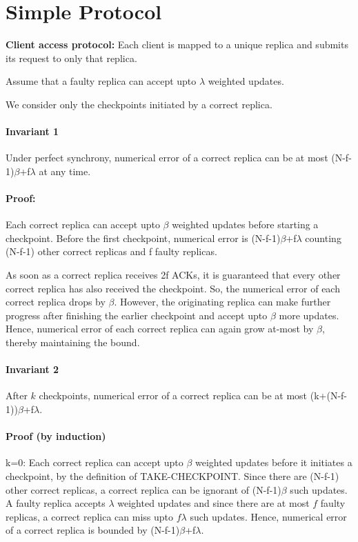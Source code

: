 \documentclass[letterpaper,twocolumn,10pt]{article}
\begin{document}
\section{Simple Protocol}
\textbf{Client access protocol:}
Each client is mapped to a unique replica and 
submits its request to only that replica.

Assume that a faulty replica can accept upto $\lambda$ weighted
updates.

We consider only the checkpoints initiated by a correct replica.

\paragraph{Invariant 1} Under perfect synchrony, numerical error
of a correct replica can be at most (N-f-1)$\beta$+f$\lambda$ at
any time.

\paragraph{Proof:} Each correct replica can accept upto $\beta$
weighted updates before starting a checkpoint. Before the first
checkpoint, numerical error is (N-f-1)$\beta$+f$\lambda$ counting
(N-f-1) other correct replicas and f faulty replicas.

As soon as a correct
replica receives 2f ACKs, it is guaranteed that every other correct
replica has also received the checkpoint. So, the numerical error
of each correct replica drops by $\beta$. However, the originating
replica can make further progress after finishing the earlier checkpoint
and accept upto $\beta$ more updates. Hence, numerical error
of each correct replica can again grow at-most by $\beta$, thereby
maintaining the bound.


\paragraph{Invariant 2} After $k$ checkpoints, numerical error of
a correct replica can be at most (k+(N-f-1))$\beta$+f$\lambda$.

\paragraph{Proof (by induction)} 
k=0: Each correct replica can accept upto $\beta$ weighted
updates before it initiates a checkpoint, by the definition
of TAKE-CHECKPOINT. Since there are (N-f-1) other correct replicas,
a correct replica can be ignorant of (N-f-1)$\beta$ such updates.
A faulty replica accepts $\lambda$ weighted updates and since
there are at most $f$ faulty replicas, a correct replica can miss upto
$f\lambda$ such updates. Hence, numerical
error of a correct replica is bounded by (N-f-1)$\beta$+f$\lambda$.
\end{document}

